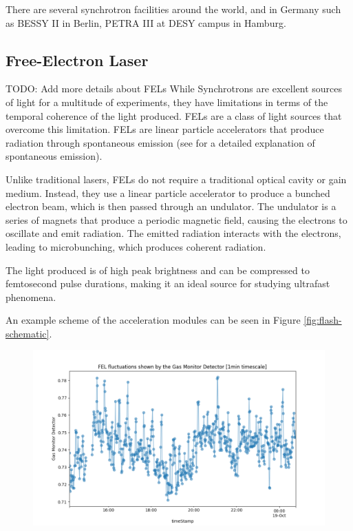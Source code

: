 There are several synchrotron facilities around the world, and in Germany such as BESSY II in Berlin, PETRA III at DESY campus in Hamburg.

\subsection{Free-Electron Laser}
TODO: Add more details about FELs
While Synchrotrons are excellent sources of light for a multitude of experiments, they have limitations in terms of the temporal coherence of the light produced. \glspl{FEL} are a class of light sources that overcome this limitation. \glspl{FEL} are linear particle accelerators that produce radiation through spontaneous emission (see \cite[Chapters 5 and 10]{foxQuantumOpticsIntroduction2006} for a detailed explanation of spontaneous emission).

Unlike traditional lasers, \glspl{FEL} do not require a traditional optical cavity or gain medium. Instead, they use a linear particle accelerator to produce a bunched electron beam, which is then passed through an undulator. The undulator is a series of magnets that produce a periodic magnetic field, causing the electrons to oscillate and emit radiation. The emitted radiation interacts with the electrons, leading to microbunching, which produces coherent radiation.

The light produced is of high peak brightness and can be compressed to femtosecond pulse durations, making it an ideal source for studying ultrafast phenomena.

An example scheme of the acceleration modules can be seen in Figure \ref{fig:flash-schematic}.

\begin{figure}
    \includegraphics[width=1\linewidth]{images/2024-08-16-13-56-32.png}
\end{figure}


